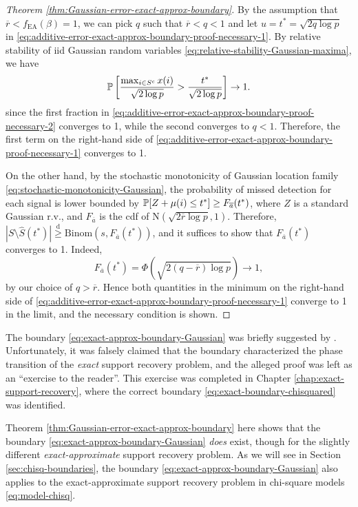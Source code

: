 \begin{proof}[Theorem \ref{thm:Gaussian-error-exact-approx-boundary}]
By the assumption that $\overline{r}<f_{\mathrm{EA}}(\beta)=1$, we can pick $q$ such that $\overline{r}<q<1$ and let $u = t^*=\sqrt{2q\log{p}}$ in \eqref{eq:additive-error-exact-approx-boundary-proof-necessary-1}.
By relative stability of iid Gaussian random variables \eqref{eq:relative-stability-Gaussian-maxima}, we have
\begin{equation} \label{eq:additive-error-exact-approx-boundary-proof-necessary-2}
    \P\left[\frac{\max_{i\in S^c} x(i)}{\sqrt{2\log{p}}} > \frac{t^*}{\sqrt{2\log{p}}}\right] \to 1.
\end{equation}
since the first fraction in \eqref{eq:additive-error-exact-approx-boundary-proof-necessary-2} converges to 1, while the second converges to $q<1$.
Therefore, the first term on the right-hand side of \eqref{eq:additive-error-exact-approx-boundary-proof-necessary-1} converges to 1.

On the other hand, by the stochastic monotonicity of Gaussian location family \eqref{eq:stochastic-monotonicity-Gaussian}, the probability of missed detection for each signal is lower bounded by $\P[Z+\mu(i) \le t^*] \ge F_{\overline{a}}(t^*)$, where $Z$ is a standard Gaussian r.v., and $F_{\overline{a}}$ is the cdf of $\mathrm{N}(\sqrt{2\overline{r}\log{p}}, 1)$.
Therefore, $|{S}\setminus\widehat{S}(t^*)| \stackrel{\mathrm{d}}{\ge} \text{Binom}(s, {F_{\overline{a}}}(t^*))$, and it suffices to show that ${F_{\overline{a}}}(t^*)$ converges to 1.
Indeed,
\begin{equation*}
    {F_{\overline{a}}}(t^*) = \Phi(\sqrt{2(q-\overline{r})\log{p}}) \to 1,
\end{equation*}
by our choice of $q>\overline{r}$.
Hence both quantities in the minimum on the right-hand side of \eqref{eq:additive-error-exact-approx-boundary-proof-necessary-1} converge to 1 in the limit, and the necessary condition is shown.
\end{proof}





\begin{remark}
The boundary \eqref{eq:exact-approx-boundary-Gaussian} was briefly suggested by \citet{arias2017distribution}.
Unfortunately, it was falsely claimed that the boundary characterized the phase transition of the \emph{exact} support recovery problem, and the alleged proof was left as an ``exercise to the reader''.
This exercise was completed in Chapter \ref{chap:exact-support-recovery}, where the correct boundary \eqref{eq:exact-boundary-chisquared} was identified. 

Theorem \ref{thm:Gaussian-error-exact-approx-boundary} here shows that the boundary \eqref{eq:exact-approx-boundary-Gaussian} \emph{does} exist, though for the slightly different \emph{exact-approximate} support recovery problem.
As we will see in Section \ref{sec:chisq-boundaries}, the boundary \eqref{eq:exact-approx-boundary-Gaussian} also applies to the exact-approximate support recovery problem in chi-square models \eqref{eq:model-chisq}.
\end{remark}


